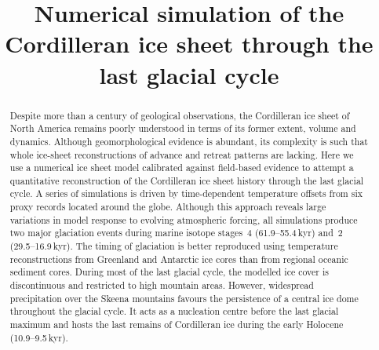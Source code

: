 \documentclass[tc, manuscript]{copernicus}
\begin{document}
\linenumbers

\title{Numerical simulation of the Cordilleran ice sheet
       through the last glacial cycle}




\received{}
\pubdiscuss{}
\revised{}
\accepted{}
\published{}

\maketitle

\begin{abstract}

  Despite more than a century of geological observations, the Cordilleran ice
  sheet of North America remains poorly understood in terms of its former
  extent, volume and dynamics. Although geomorphological evidence is abundant,
  its complexity is such that whole ice-sheet reconstructions of advance and
  retreat patterns are lacking. Here we use a numerical ice sheet model
  calibrated against field-based evidence to attempt a quantitative
  reconstruction of the Cordilleran ice sheet history through the last glacial
  cycle. A series of simulations is driven by time-dependent temperature
  offsets from six proxy records located around the globe. Although this
  approach reveals large variations in model response to evolving atmospheric
  forcing, all simulations produce two major glaciation events during
  marine isotope stages~4 (61.9--55.4\,kyr) and~2
  (29.5--16.9\,kyr). The timing of glaciation is
  better reproduced using temperature reconstructions from Greenland and
  Antarctic ice cores than from regional oceanic sediment cores. During most of
  the last glacial cycle, the modelled ice cover is discontinuous and
  restricted to high mountain areas. However, widespread precipitation over the
  Skeena mountains favours the persistence of a central ice dome throughout the
  glacial cycle. It acts as a nucleation centre before the last glacial maximum
  and hosts the last remains of Cordilleran ice during the
  early Holocene (10.9--9.5\,kyr).

\end{abstract}
\end{document}
